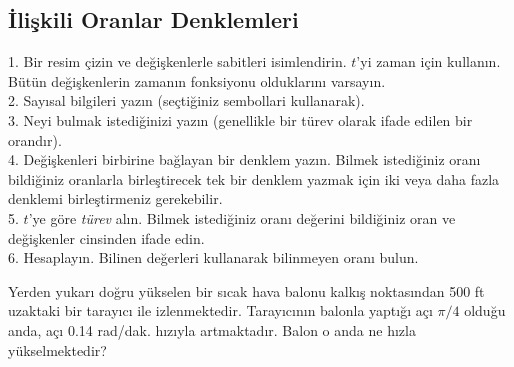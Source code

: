 \subsection{\protect İlişkili Oranlar Denklemleri}
1. Bir resim çizin ve değişkenlerle sabitleri isimlendirin. $t$'yi zaman için kullanın. Bütün değişkenlerin zamanın fonksiyonu olduklarını varsayın.\\
2. Sayısal bilgileri yazın (seçtiğiniz sembollari kullanarak).\\
3. Neyi bulmak istediğinizi yazın (genellikle bir türev olarak ifade edilen bir orandır).\\
4. Değişkenleri birbirine bağlayan bir denklem yazın. Bilmek istediğiniz oranı bildiğiniz oranlarla birleştirecek tek bir denklem yazmak için iki veya daha fazla denklemi birleştirmeniz gerekebilir.\\
5. $t$'ye göre \textit{türev} alın. Bilmek istediğiniz oranı değerini bildiğiniz oran ve değişkenler cinsinden ifade edin.\\
6. Hesaplayın. Bilinen değerleri kullanarak bilinmeyen oranı bulun.

\begin{ornek}
	Yerden yukarı doğru yükselen bir sıcak hava balonu kalkış noktasından 500 ft uzaktaki bir tarayıcı ile izlenmektedir. Tarayıcının balonla yaptığı açı $\pi/4$ olduğu anda, açı 0.14 rad/dak. hızıyla artmaktadır. Balon o anda ne hızla yükselmektedir?
\end{ornek}

